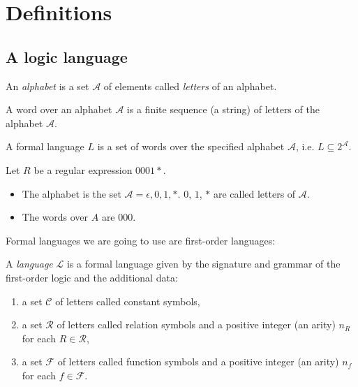 \section{Definitions}

\subsection{A logic language}
\begin{defn}
An \emph{alphabet} is a set $\mathcal{A}$ of elements called \emph{letters} of an alphabet.
\end{defn}

\begin{defn}
A word over an alphabet $\mathcal{A}$ is a finite sequence (a string) of letters of the alphabet $\mathcal{A}$.
\end{defn}

\begin{defn}
A formal language $L$ is a set of words over the specified alphabet $\mathcal{A}$, i.e. $L \subseteq 2^\mathcal{A}$.
\end{defn}

\begin{exmp}
Let $R$ be a regular expression $0001*$.
\begin{itemize}
\item The alphabet is the set $\mathcal{A}={\epsilon, 0,1,*}$. $0$, $1$, $*$ are called letters of $\mathcal{A}$.
\item The words over $A$ are $000$.
\end{itemize}
\end{exmp}

Formal languages we are going to use are first-order languages:
\begin{defn}
A \emph{language} $\mathcal{L}$ is a formal language given by the signature and grammar of the first-order logic and the additional data:
\begin{enumerate}
\item a set $\mathcal{C}$ of letters called constant symbols,
\item a set $\mathcal{R}$ of letters called relation symbols and a positive integer (an arity) $n_R$ for each $R \in \mathcal{R}$,
\item a set $\mathcal{F}$ of letters called function symbols and a positive integer (an arity) $n_f$ for each $f \in \mathcal{F}$.
\end{enumerate}
\end{defn}


